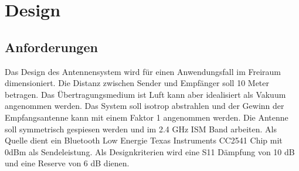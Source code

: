 \section{Design}
\subsection{Anforderungen}
Das Design des Antennensystem wird für einen Anwendungsfall im Freiraum dimensioniert. Die Distanz zwischen Sender und Empfänger soll 10 Meter betragen. Das Übertragungsmedium ist Luft kann aber idealisiert als Vakuum angenommen werden. Das System soll isotrop abstrahlen und der Gewinn der Empfangsantenne kann mit einem Faktor  1 angenommen werden. Die Antenne soll symmetrisch gespiesen werden und im 2.4 GHz ISM Band arbeiten. Als Quelle dient ein Bluetooth Low Energie Texas Instruments CC2541 Chip mit 0dBm als Sendeleistung. Als Designkriterien wird eine S11 Dämpfung von 10 dB und eine Reserve von 6 dB dienen.
\\
